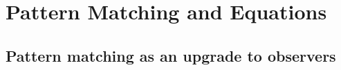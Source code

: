 \documentclass[manuscript,screen,review, 12pt]{acmart}
\begin{document}


\section{Pattern Matching and Equations}
\label{pmandequations}
\subsection{Pattern matching as an upgrade to observers}
\label{pmoverobservers}
\end{document}
